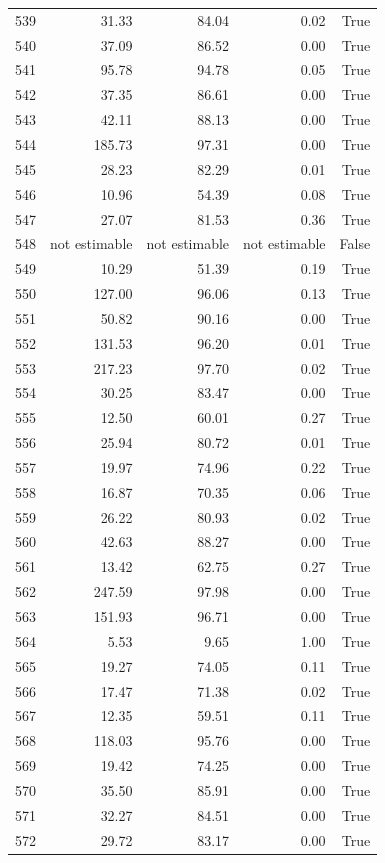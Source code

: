 \begin{longtable}{rrrrr}
539 & 31.33 & 84.04 & 0.02 & True \\
540 & 37.09 & 86.52 & 0.00 & True \\
541 & 95.78 & 94.78 & 0.05 & True \\
542 & 37.35 & 86.61 & 0.00 & True \\
543 & 42.11 & 88.13 & 0.00 & True \\
544 & 185.73 & 97.31 & 0.00 & True \\
545 & 28.23 & 82.29 & 0.01 & True \\
546 & 10.96 & 54.39 & 0.08 & True \\
547 & 27.07 & 81.53 & 0.36 & True \\
548 & not estimable & not estimable & not estimable & False \\
549 & 10.29 & 51.39 & 0.19 & True \\
550 & 127.00 & 96.06 & 0.13 & True \\
551 & 50.82 & 90.16 & 0.00 & True \\
552 & 131.53 & 96.20 & 0.01 & True \\
553 & 217.23 & 97.70 & 0.02 & True \\
554 & 30.25 & 83.47 & 0.00 & True \\
555 & 12.50 & 60.01 & 0.27 & True \\
556 & 25.94 & 80.72 & 0.01 & True \\
557 & 19.97 & 74.96 & 0.22 & True \\
558 & 16.87 & 70.35 & 0.06 & True \\
559 & 26.22 & 80.93 & 0.02 & True \\
560 & 42.63 & 88.27 & 0.00 & True \\
561 & 13.42 & 62.75 & 0.27 & True \\
562 & 247.59 & 97.98 & 0.00 & True \\
563 & 151.93 & 96.71 & 0.00 & True \\
564 & 5.53 & 9.65 & 1.00 & True \\
565 & 19.27 & 74.05 & 0.11 & True \\
566 & 17.47 & 71.38 & 0.02 & True \\
567 & 12.35 & 59.51 & 0.11 & True \\
568 & 118.03 & 95.76 & 0.00 & True \\
569 & 19.42 & 74.25 & 0.00 & True \\
570 & 35.50 & 85.91 & 0.00 & True \\
571 & 32.27 & 84.51 & 0.00 & True \\
572 & 29.72 & 83.17 & 0.00 & True \\

\end{longtable}
